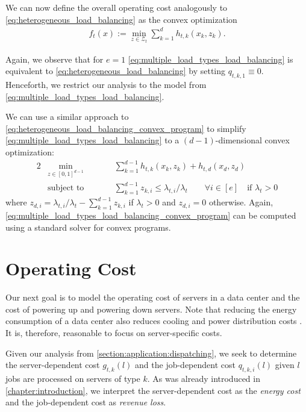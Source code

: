 We can now define the overall operating cost analogously to \autoref{eq:heterogeneous_load_balancing} as the convex optimization \begin{align}\label{eq:multiple_load_types_load_balancing}
    f_t(x) := \min_{z \in \mathcal{Z}_t} \sum_{k=1}^d h_{t,k}(x_k,z_k).
\end{align}

Again, we observe that for $e = 1$ \autoref{eq:multiple_load_types_load_balancing} is equivalent to \autoref{eq:heterogeneous_load_balancing} by setting $q_{t,k,1} \equiv 0$. Henceforth, we restrict our analysis to the model from \autoref{eq:multiple_load_types_load_balancing}.

We can use a similar approach to \autoref{eq:heterogeneous_load_balancing_convex_program} to simplify \autoref{eq:multiple_load_types_load_balancing} to a $(d-1)$-dimensional convex optimization: \begin{alignat}{2}\label{eq:multiple_load_types_load_balancing_convex_program}
    &\min_{z \in [0,1]^{d-1}} &\qquad&\sum_{k=1}^{d-1} h_{t,k}(x_k,z_k) + h_{t,d}(x_d,z_d) \\
    &\textrm{subject to}  &      &\sum_{k=1}^{d-1} z_{k,i} \leq \lambda_{t,i} / \lambda_t \qquad\forall i \in [e]\quad\text{if }\lambda_t > 0 \nonumber
\end{alignat} where $z_{d,i} = \lambda_{t,i} / \lambda_t - \sum_{k=1}^{d-1} z_{k,i}$ if $\lambda_t > 0$ and $z_{d,i} = 0$ otherwise. Again, \autoref{eq:multiple_load_types_load_balancing_convex_program} can be computed using a standard solver for convex programs.

\section{Operating Cost}\label{section:application:operating_cost}

Our next goal is to model the operating cost of servers in a data center and the cost of powering up and powering down servers. Note that reducing the energy consumption of a data center also reduces cooling and power distribution costs \cite{Lin2011, Clark2005}. It is, therefore, reasonable to focus on server-specific costs.

Given our analysis from \autoref{section:application:dispatching}, we seek to determine the server-dependent cost $g_{t,k}(l)$ and the job-dependent cost $q_{t,k,i}(l)$ given $l$ jobs are processed on servers of type $k$. As was already introduced in \autoref{chapter:introduction}, we interpret the server-dependent cost as the \emph{energy cost} and the job-dependent cost as \emph{revenue loss}.

